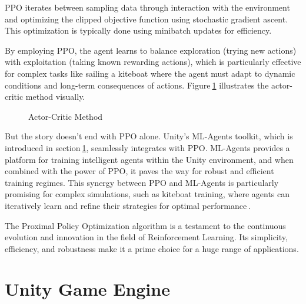 PPO iterates between sampling data through interaction with the environment and optimizing the clipped objective function using stochastic gradient ascent. This optimization is typically done using minibatch updates for efficiency.

By employing PPO, the agent learns to balance exploration (trying new actions) with exploitation (taking known rewarding actions), which is particularly effective for complex tasks like sailing a kiteboat where the agent must adapt to dynamic conditions and long-term consequences of actions. Figure$~$\ref{actor_critic} illustrates the actor-critic method visually.

\begin{figure}
    \centering
    \caption{Actor-Critic Method}\label{actor_critic}
\end{figure}

But the story doesn't end with PPO alone. Unity's ML-Agents toolkit, which is introduced in section$~$\ref{unity}, seamlessly integrates with PPO. ML-Agents provides a platform for training intelligent agents within the Unity environment, and when combined with the power of PPO, it paves the way for robust and efficient training regimes. This synergy between PPO and ML-Agents is particularly promising for complex simulations, such as kiteboat training, where agents can iteratively learn and refine their strategies for optimal performance$~$\cite{mlagents_ppo}.

The Proximal Policy Optimization algorithm is a testament to the continuous evolution and innovation in the field of Reinforcement Learning. Its simplicity, efficiency, and robustness make it a prime choice for a huge range of applications. 

\section{Unity Game Engine}\label{unity}

